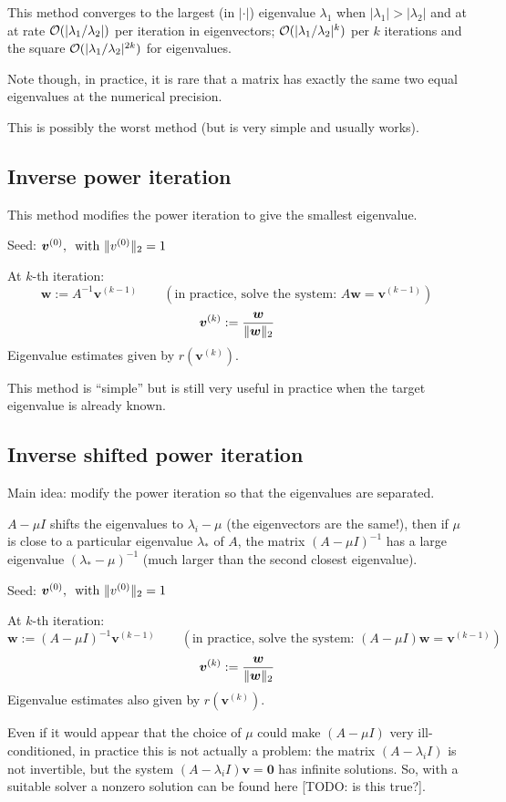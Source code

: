\documentclass[
  12pt,
  paper=a4,
]{scrartcl} %
\begin{document}
This method converges to the largest (in $|\cdot|$) eigenvalue $\lambda_1$ when $|\lambda_1| > |\lambda_2|$ and at at rate $\mathcal{O}(|\lambda_1 / \lambda_2|)$ per iteration in eigenvectors; $\mathcal{O}(|\lambda_1 / \lambda_2|^k)$ per $k$ iterations and the square $\mathcal{O}(|\lambda_1 / \lambda_2|^{2k})$ for eigenvalues.

Note though, in practice, it is rare that a matrix has exactly the same two equal eigenvalues at the numerical precision.

This is possibly the worst method (but is very simple and usually works).

\subsection*{Inverse power iteration}

This method modifies the power iteration to give the smallest eigenvalue.

Seed: $\bm v^{(0)}, \, \text{ with }\|v^{(0)}\|_2 = 1$

At $k$-th iteration:
\[
    \bm w := A^{-1} \bm v^{(k-1)} \qquad 
    (\text{in practice, solve the system: }A\bm w = \bm v^{(k-1)})
\]
\[
    \bm v^{(k)} := \frac{\bm w}{\|\bm w\|_2}
\]
Eigenvalue estimates given by $r(\bm v^{(k)})
$.

This method is ``simple'' but is still very useful in practice when the target eigenvalue is already known.

\subsection*{Inverse shifted power iteration}

Main idea: modify the power iteration so that the eigenvalues are separated.

$A-\mu I$ shifts the eigenvalues to $\lambda_i-\mu$ (the eigenvectors are the same!), then if $\mu$ is close to a particular eigenvalue $\lambda_*$ of $A$, the matrix $(A-\mu I)^{-1}$ has a large eigenvalue $(\lambda_*-\mu)^{-1}$ (much larger than the second closest eigenvalue).

Seed: $\bm v^{(0)}, \, \text{ with }\|v^{(0)}\|_2 = 1$

At $k$-th iteration:
\[
    \bm w := (A-\mu I)^{-1} \bm v^{(k-1)} \qquad 
    (\text{in practice, solve the system: }(A-\mu I)\bm w = \bm v^{(k-1)})
\]
\[
    \bm v^{(k)} := \frac{\bm w}{\|\bm w\|_2}
\]
Eigenvalue estimates also given by $r(\bm v^{(k)})
$.

Even if it would appear that the choice of $\mu$ could make $(A-\mu I)$ very ill-conditioned, in practice this is not actually a problem:  the matrix $(A-\lambda_i I)$ is not invertible, but the system $(A-\lambda_i I)\bm v = \bm 0$ has infinite solutions. So, with a suitable solver a nonzero solution can be found here [TODO: is this true?].
\end{document}
